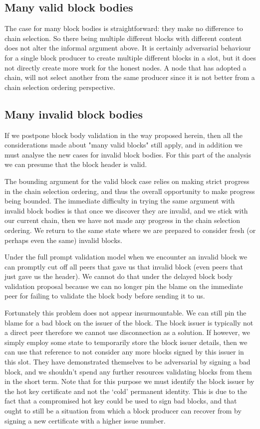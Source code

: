 \documentclass[11pt,a4paper]{article}
\begin{document}
\subsection{Many valid block bodies}
The case for many block bodies is straightforward: they make no difference to
chain selection. So there being multiple different blocks with different
content does not alter the informal argument above. It is certainly adversarial
behaviour for a single block producer to create multiple different blocks in a
slot, but it does not directly create more work for the honest nodes. A node that
has adopted a chain, will not select another from the same producer since it is not
better from a chain selection ordering perspective.

\subsection{Many invalid block bodies}
\label{many-invalid-block-bodies}
If we postpone block body validation in the way proposed herein, then all the
considerations made about "many valid blocks" still apply, and in addition we must
analyse the new cases for invalid block bodies. For this part of the analysis
we can presume that the block header is valid.

The bounding argument for the valid block case relies on making strict
progress in the chain selection ordering, and thus the overall opportunity to make
progress being bounded. The immediate difficulty in trying the same argument
with invalid block bodies is that once we discover they are invalid, and we
stick with our current chain, then we have not made any progress in the chain
selection ordering. We return to the same state where we are prepared to
consider fresh (or perhaps even the same) invalid blocks.

Under the full prompt validation model when we encounter an invalid block we
can promptly cut off all peers that gave us that invalid block (even peers
that just gave us the header). We cannot do that under the delayed block body
validation proposal because we can no longer pin the blame on the immediate
peer for failing to validate the block body before sending it to us.

Fortunately this problem does not appear insurmountable. We can still pin the
blame for a bad block on the issuer of the block. The block issuer is typically
not a direct peer therefore we cannot use disconnection as a solution. If however, we simply
employ some state to temporarily store the block issuer details, then we can use that reference
to not consider any more blocks signed by this issuer in this slot. They
have demonstrated themselves to be adversarial by signing a bad block, and we
shouldn't spend any further resources validating blocks from them in the short term. 
Note that for this purpose we must identify the block issuer by the hot key certificate and 
not the `cold' permanent identity. This is due to the fact that a compromised hot key could 
be used to sign bad blocks, and that ought to still be a situation from which a block producer can 
recover from by signing a new certificate with a higher issue number.
\end{document}
